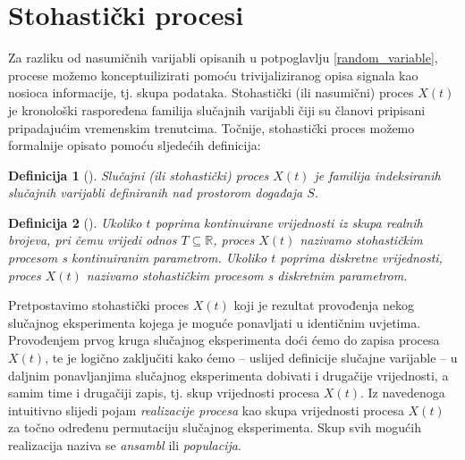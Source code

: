 \documentclass[a4paper,12pt,oneside]{memoir}
\newtheorem{definition}{Definicija}[chapter]
\begin{document}
 
        \section{Stohastički procesi} \label{stoh_proc}



            Za razliku od nasumičnih varijabli opisanih u potpoglavlju \ref{random_variable}, procese možemo konceptuilizirati pomoću trivijaliziranog opisa signala kao nosioca informacije, tj. skupa podataka. Stohastički (ili nasumični) proces $X(t)$ je kronološki raspoređena familija slučajnih varijabli čiji su članovi pripisani pripadajućim vremenskim trenutcima. Točnije, stohastički proces možemo formalnije opisato pomoću sljedećih definicija:

            \begin{definition}[\cite{Bahovec}]
                Slučajni (ili stohastički) proces ${X(t)}$ je familija indeksiranih slučajnih varijabli definiranih nad prostorom događaja $S$.
            \end{definition}

            \begin{definition}[\cite{Priestley}]
                Ukoliko $t$ poprima kontinuirane vrijednosti iz skupa realnih brojeva, pri čemu vrijedi odnos $T\subseteq \mathbb{R}$, proces ${X(t)}$ nazivamo stohastičkim procesom s kontinuiranim parametrom. Ukoliko $t$ poprima diskretne vrijednosti, proces ${X(t)}$ nazivamo stohastičkim procesom s diskretnim parametrom.
            \end{definition}

            Pretpostavimo stohastički proces ${X(t)}$ koji je rezultat provođenja nekog slučajnog eksperimenta kojega je moguće ponavljati u identičnim uvjetima. Provođenjem prvog kruga slučajnog eksperimenta doći ćemo do zapisa procesa ${X(t)}$, te je logično zaključiti kako ćemo -- uslijed definicije slučajne varijable -- u daljnim ponavljanjima slučajnog eksperimenta dobivati i drugačije vrijednosti, a samim time i drugačiji zapis, tj. skup vrijednosti procesa ${X(t)}$. Iz navedenoga intuitivno slijedi pojam \textit{realizacije procesa} kao skupa vrijednosti procesa ${X(t)}$ za točno određenu permutaciju slučajnog eksperimenta. Skup svih mogućih realizacija naziva se \textit{ansambl} ili \textit{populacija}.
\end{document}
